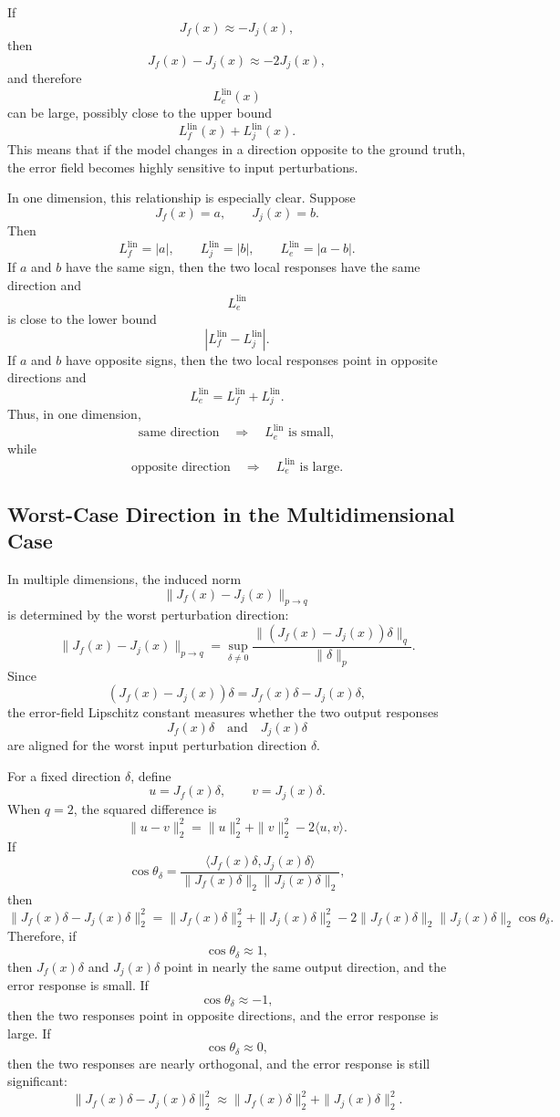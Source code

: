 \documentclass{article}
\begin{document}
If
\[
J_f(x)\approx -J_j(x),
\]
then
\[
J_f(x)-J_j(x)\approx -2J_j(x),
\]
and therefore
\[
L_e^{\mathrm{lin}}(x)
\]
can be large, possibly close to the upper bound
\[
L_f^{\mathrm{lin}}(x)+L_j^{\mathrm{lin}}(x).
\]
This means that if the model changes in a direction opposite to the ground truth, the error field becomes highly sensitive to input perturbations.

In one dimension, this relationship is especially clear. Suppose
\[
J_f(x)=a,
\qquad
J_j(x)=b.
\]
Then
\[
L_f^{\mathrm{lin}}=|a|,
\qquad
L_j^{\mathrm{lin}}=|b|,
\qquad
L_e^{\mathrm{lin}}=|a-b|.
\]
If \(a\) and \(b\) have the same sign, then the two local responses have the same direction and
\[
L_e^{\mathrm{lin}}
\]
is close to the lower bound
\[
\left|
L_f^{\mathrm{lin}}-L_j^{\mathrm{lin}}
\right|.
\]
If \(a\) and \(b\) have opposite signs, then the two local responses point in opposite directions and
\[
L_e^{\mathrm{lin}}
=
L_f^{\mathrm{lin}}+L_j^{\mathrm{lin}}.
\]
Thus, in one dimension,
\[
\text{same direction}
\quad\Longrightarrow\quad
L_e^{\mathrm{lin}} \text{ is small},
\]
while
\[
\text{opposite direction}
\quad\Longrightarrow\quad
L_e^{\mathrm{lin}} \text{ is large}.
\]

\subsection{Worst-Case Direction in the Multidimensional Case}

In multiple dimensions, the induced norm
\[
\|J_f(x)-J_j(x)\|_{p\to q}
\]
is determined by the worst perturbation direction:
\[
\|J_f(x)-J_j(x)\|_{p\to q}
=
\sup_{\delta\neq 0}
\frac{
\|(J_f(x)-J_j(x))\delta\|_q
}{
\|\delta\|_p
}.
\]
Since
\[
(J_f(x)-J_j(x))\delta
=
J_f(x)\delta-J_j(x)\delta,
\]
the error-field Lipschitz constant measures whether the two output responses
\[
J_f(x)\delta
\quad\text{and}\quad
J_j(x)\delta
\]
are aligned for the worst input perturbation direction \(\delta\).

For a fixed direction \(\delta\), define
\[
u=J_f(x)\delta,
\qquad
v=J_j(x)\delta.
\]
When \(q=2\), the squared difference is
\[
\|u-v\|_2^2
=
\|u\|_2^2+\|v\|_2^2-2\langle u,v\rangle.
\]
If
\[
\cos\theta_\delta
=
\frac{
\langle J_f(x)\delta,J_j(x)\delta\rangle
}{
\|J_f(x)\delta\|_2
\|J_j(x)\delta\|_2
},
\]
then
\[
\|J_f(x)\delta-J_j(x)\delta\|_2^2
=
\|J_f(x)\delta\|_2^2
+
\|J_j(x)\delta\|_2^2
-
2
\|J_f(x)\delta\|_2
\|J_j(x)\delta\|_2
\cos\theta_\delta.
\]
Therefore, if
\[
\cos\theta_\delta\approx 1,
\]
then \(J_f(x)\delta\) and \(J_j(x)\delta\) point in nearly the same output direction, and the error response is small. If
\[
\cos\theta_\delta\approx -1,
\]
then the two responses point in opposite directions, and the error response is large. If
\[
\cos\theta_\delta\approx 0,
\]
then the two responses are nearly orthogonal, and the error response is still significant:
\[
\|J_f(x)\delta-J_j(x)\delta\|_2^2
\approx
\|J_f(x)\delta\|_2^2
+
\|J_j(x)\delta\|_2^2.
\]
\end{document}
